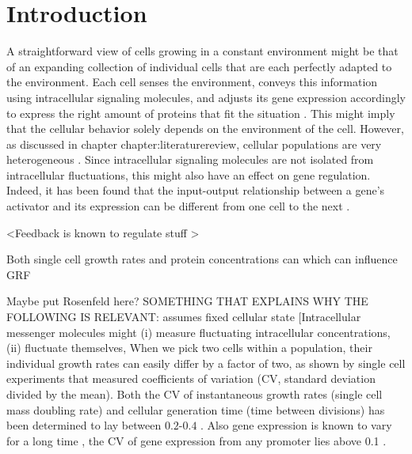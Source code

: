 
\section{Introduction}


A straightforward view of cells growing in a constant environment might be 
that of an expanding collection of individual cells that are each perfectly adapted to the environment.
%
Each cell senses the environment, 
conveys this information using intracellular signaling molecules, 
and adjusts its gene expression accordingly to 
express the right amount of proteins that fit the situation \cite{Bray1995, Alon2006, Alon2007, Tyson2010}.
%
This might imply that the cellular behavior solely depends on the environment of the cell.
%
However, as discussed in chapter {chapter:literaturereview}, cellular populations are very heterogeneous \cite{Kiviet2014, Hashimoto2016}.
%
Since intracellular signaling molecules are not isolated from intracellular fluctuations, 
this might also have an effect on gene regulation.
%
Indeed, it has been found that the input-output relationship between a gene's activator and its expression can be different from one cell to the next \cite{Rosenfeld2005, Keegstra2017}.

\cite{Brandman2008}
\cite{Rosenfeld2007}
\cite{Zambrano2015}
\cite{Howell2012}
\cite{Nevozhay2009}
\cite{Hornung2008}
\cite{Dublanche2006}
\cite{Becskei2000}
\cite{Swain2004}
\cite{Bowsher2013}
\cite{Avery2006}
\cite{Maheshri2007}
\cite{Levine2007a}
\cite{Bennett2008a}
\cite{Smits2006}
\cite{Balazsi2011}
\cite{Raj2008}
\cite{Davidson2008}
\cite{Elowitz2002}
\cite{Bruggeman2009}
\cite{Kitano2004a}


<Feedback is known to regulate stuff \cite{Goyal2010}>

Both single cell growth rates and protein concentrations can 
which can influence GRF

Maybe put Rosenfeld here?
SOMETHING THAT EXPLAINS WHY THE FOLLOWING IS RELEVANT:
assumes fixed cellular state
[Intracellular messenger molecules might (i) measure fluctuating intracellular concentrations, (ii) fluctuate themselves, 
%
When we pick two cells within a population, their individual growth rates can easily differ by a factor of two, 
as shown by single cell experiments that measured coefficients of variation (CV, standard deviation divided by the mean).
%
Both the CV of instantaneous growth rates (single cell mass doubling rate) and cellular generation time (time between divisions) has been determined to lay between $0.2$-$0.4$ \cite{Kiviet2014, Hashimoto2016}.
%
Also gene expression is known to vary for a long time \cite{Elowitz2002}, 
the CV of gene expression from any promoter lies above 0.1 \cite{Keren2015}.


